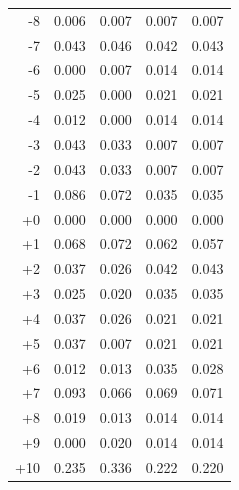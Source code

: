 \begin{table}[t]
\begin{tabular}{rrrrr}
    -8 & 0.006 & 0.007 & 0.007 & 0.007 \\
    -7 & 0.043 & 0.046 & 0.042 & 0.043 \\
    -6 & 0.000 & 0.007 & 0.014 & 0.014 \\
    -5 & 0.025 & 0.000 & 0.021 & 0.021 \\
    -4 & 0.012 & 0.000 & 0.014 & 0.014 \\
    -3 & 0.043 & 0.033 & 0.007 & 0.007 \\
    -2 & 0.043 & 0.033 & 0.007 & 0.007 \\
    -1 & 0.086 & 0.072 & 0.035 & 0.035 \\
    +0 & 0.000 & 0.000 & 0.000 & 0.000 \\
    +1 & 0.068 & 0.072 & 0.062 & 0.057 \\
    +2 & 0.037 & 0.026 & 0.042 & 0.043 \\
    +3 & 0.025 & 0.020 & 0.035 & 0.035 \\
    +4 & 0.037 & 0.026 & 0.021 & 0.021 \\
    +5 & 0.037 & 0.007 & 0.021 & 0.021 \\
    +6 & 0.012 & 0.013 & 0.035 & 0.028 \\
    +7 & 0.093 & 0.066 & 0.069 & 0.071 \\
    +8 & 0.019 & 0.013 & 0.014 & 0.014 \\
    +9 & 0.000 & 0.020 & 0.014 & 0.014 \\
    +10 & 0.235 & 0.336 & 0.222 & 0.220 \\
    \hline
    \end{tabular}
\end{table}
